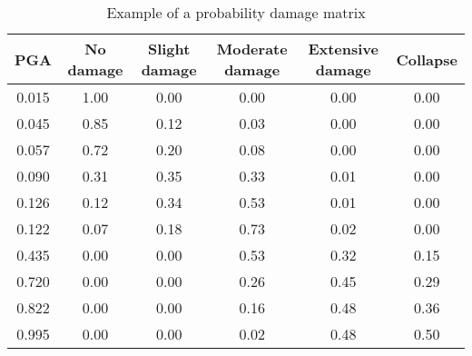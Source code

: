 \begin {table}[htb]
\caption{Example of a probability damage matrix}
\label{table:PDM}
\begin{center}
  \begin{tabular}{ | c | c | c | c | c | c |}
  \hline
    PGA & No damage & Slight damage & Moderate damage & Extensive damage & Collapse \\ \hline
    0.015 & 1.00 & 0.00 & 0.00 & 0.00 & 0.00 \\ \hline
    0.045 & 0.85 & 0.12 & 0.03 & 0.00 & 0.00 \\ \hline
    0.057 & 0.72 & 0.20 & 0.08 & 0.00 & 0.00 \\ \hline
    0.090 & 0.31 & 0.35 & 0.33 & 0.01 & 0.00 \\ \hline
    0.126 & 0.12 & 0.34 & 0.53 & 0.01 & 0.00 \\ \hline
    0.122 & 0.07 & 0.18 & 0.73 & 0.02 & 0.00 \\ \hline
    0.435 & 0.00 & 0.00 & 0.53 & 0.32 & 0.15 \\ \hline
    0.720 & 0.00 & 0.00 & 0.26 & 0.45 & 0.29 \\ \hline
    0.822 & 0.00 & 0.00 & 0.16 & 0.48 & 0.36 \\ \hline
    0.995 & 0.00 & 0.00 & 0.02 & 0.48 & 0.50 \\ \hline
  \end{tabular}
\end{center}
\end{table}
